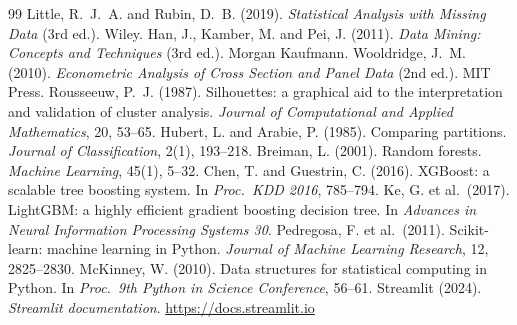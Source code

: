 \documentclass[11pt,a4paper]{article}
\begin{document}
\begin{thebibliography}{99}
 Little, R.~J.~A. and Rubin, D.~B. (2019). \emph{Statistical Analysis with Missing Data} (3rd ed.). Wiley.
 Han, J., Kamber, M. and Pei, J. (2011). \emph{Data Mining: Concepts and Techniques} (3rd ed.). Morgan Kaufmann.
 Wooldridge, J.~M. (2010). \emph{Econometric Analysis of Cross Section and Panel Data} (2nd ed.). MIT Press.
 Rousseeuw, P.~J. (1987). Silhouettes: a graphical aid to the interpretation and validation of cluster analysis. \emph{Journal of Computational and Applied Mathematics}, 20, 53--65.
 Hubert, L. and Arabie, P. (1985). Comparing partitions. \emph{Journal of Classification}, 2(1), 193--218.
 Breiman, L. (2001). Random forests. \emph{Machine Learning}, 45(1), 5--32.
 Chen, T. and Guestrin, C. (2016). XGBoost: a scalable tree boosting system. In \emph{Proc.\ KDD 2016}, 785--794.
 Ke, G. et al.\ (2017). LightGBM: a highly efficient gradient boosting decision tree. In \emph{Advances in Neural Information Processing Systems 30}.
 Pedregosa, F. et al.\ (2011). Scikit-learn: machine learning in Python. \emph{Journal of Machine Learning Research}, 12, 2825--2830.
 McKinney, W. (2010). Data structures for statistical computing in Python. In \emph{Proc.\ 9th Python in Science Conference}, 56--61.
 Streamlit (2024). \emph{Streamlit documentation}. \url{https://docs.streamlit.io}
\end{thebibliography}

\appendix
\end{document}

